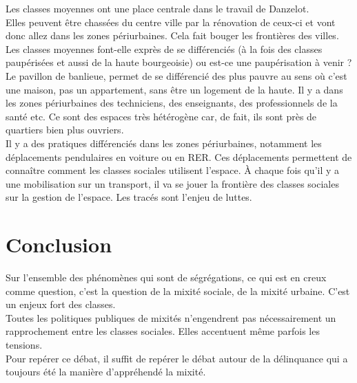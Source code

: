 \documentclass[12pt, a4paper, openany]{book}
\begin{document}
Les classes moyennes ont une place centrale dans le travail de Danzelot. \\
Elles peuvent être chassées du centre ville par la rénovation de ceux-ci et vont donc allez dans les zones périurbaines. Cela fait bouger les frontières des villes. \\
Les classes moyennes font-elle exprès de se différenciés (à la fois des classes paupérisées et aussi de la haute bourgeoisie) ou est-ce une paupérisation à venir ? \\
Le pavillon de banlieue, permet de se différencié des plus pauvre au sens où c'est une maison, pas un appartement, sans être un logement de la haute. Il y a dans les zones périurbaines des techniciens, des enseignants, des professionnels de la santé etc. Ce sont des espaces très hétérogène car, de fait, ils sont près de quartiers bien plus ouvriers. \\
Il y a des pratiques différenciés dans les zones périurbaines, notamment les déplacements pendulaires en voiture ou en RER. Ces déplacements permettent de connaître comment les classes sociales utilisent l'espace. À chaque fois qu'il y a une mobilisation sur un transport, il va se jouer la frontière des classes sociales sur la gestion de l'espace. Les tracés sont l'enjeu de luttes.

\section{Conclusion}

Sur l'ensemble des phénomènes qui sont de ségrégations, ce qui est en creux comme question, c'est la question de la mixité sociale, de la mixité urbaine. C'est un enjeux fort des classes. \\
Toutes les politiques publiques de mixités n'engendrent pas nécessairement un rapprochement entre les classes sociales. Elles accentuent même parfois les tensions. \\
Pour repérer ce débat, il suffit de repérer le débat autour de la délinquance qui a toujours été la manière d'appréhendé la mixité. 
\end{document}
